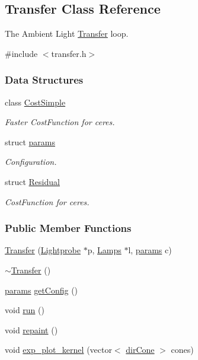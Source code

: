 \hypertarget{classTransfer}{\subsection{\-Transfer \-Class \-Reference}
\label{classTransfer}
}


\-The \-Ambient \-Light \hyperlink{classTransfer}{\-Transfer} loop.  




{\ttfamily \#include $<$transfer.\-h$>$}

\subsubsection*{\-Data \-Structures}
\begin{DoxyCompactItemize}
\item 
class \hyperlink{classTransfer_1_1CostSimple}{\-Cost\-Simple}
\begin{DoxyCompactList}\small\item\em \-Faster \-Cost\-Function for ceres. \end{DoxyCompactList}\item 
struct \hyperlink{structTransfer_1_1params}{params}
\begin{DoxyCompactList}\small\item\em \-Configuration. \end{DoxyCompactList}\item 
struct \hyperlink{structTransfer_1_1Residual}{\-Residual}
\begin{DoxyCompactList}\small\item\em \-Cost\-Function for ceres. \end{DoxyCompactList}\end{DoxyCompactItemize}
\subsubsection*{\-Public \-Member \-Functions}
\begin{DoxyCompactItemize}
\item 
\hyperlink{classTransfer_a5cbc38107da382c825951777aa55051c}{\-Transfer} (\hyperlink{classLightprobe}{\-Lightprobe} $\ast$p, \hyperlink{classLamps}{\-Lamps} $\ast$l, \hyperlink{structTransfer_1_1params}{params} c)
\item 
\hyperlink{classTransfer_a13481dd70d04bbe779459f85ad8afa9c}{$\sim$\-Transfer} ()
\item 
\hyperlink{structTransfer_1_1params}{params} \hyperlink{classTransfer_acddbd3dd2f407cd9da07c2427d1882ed}{get\-Config} ()
\item 
void \hyperlink{classTransfer_aa98f154d6de395921b9d9c7c04288f7d}{run} ()
\item 
void \hyperlink{classTransfer_ace9b65159cff9a2935400a03e5ffd4de}{repaint} ()
\item 
void \hyperlink{classTransfer_a6be79ed07466c21d17f543bc515b8263}{exp\-\_\-plot\-\_\-kernel} (vector$<$ \hyperlink{structdirCone}{dir\-Cone} $>$ cones)
\end{DoxyCompactItemize}
